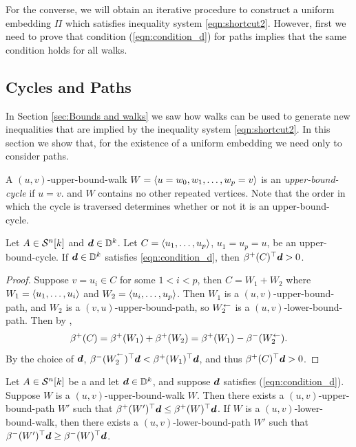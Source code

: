 \documentclass[runningheads]{llncs}
\begin{document}
For the converse, we will obtain an iterative procedure to construct a uniform embedding $\Pi$ which satisfies inequality system \cref{eqn:shortcut2}. However, first we need to prove that condition (\ref{eqn:condition_d}) for paths implies that the same condition holds for all walks. 

\subsection{Cycles and Paths}\label{sec:partial order}



In Section \ref{sec:Bounds and walks} we saw how walks can be used to generate new inequalities that are implied by the inequality system \ref{eqn:shortcut2}. 
In this section we show that, for the existence of a uniform embedding we need only to consider paths.

A $(u,v)$-upper-bound-walk $W=\langle u=w_0,w_1,\dots ,w_p=v\rangle$ is an {\em upper-bound-cycle} if $u=v$. and $W$ contains no other repeated vertices. Note that the order in which the cycle is traversed determines whether or not it is an upper-bound-cycle.


\begin{lemma}\label{lemma:ub cycle geq 0}
Let $A\in\mathcal S^n[k]$  and $\boldsymbol d\in\mathbb D^k$.
Let $C=\langle u_1,\dots, u_p\rangle$, $u_1=u_p=u$, be an upper-bound-cycle.
If $\boldsymbol d\in\mathbb D^k$ satisfies \cref{eqn:condition_d}, then $\beta^+(C)^\top\boldsymbol d > 0$.
\end{lemma}
\begin{proof}
Suppose $v=u_i\in C$ for some $1<i<p$, then $C=W_1 + W_2$ where 
$W_1=\langle u_1,\dots, u_i\rangle$  and 
$W_2 = \langle u_i,\dots, u_p\rangle$. Then $W_1$ is a $(u,v)$-upper-bound-path, and $W_2$ is a $(v,u)$-upper-bound-path, so $W_2^{\leftarrow}$ is a $(u,v)$-lower-bound-path.
Then by ,
$$
\beta^+(C) = \beta^+(W_1)+\beta^+(W_2)=\beta^+(W_1)-\beta^-(W_2^{\leftarrow}).
$$
By the choice of $\boldsymbol d$, 
$\beta^-(W_2^{^{\leftarrow}} )^\top \boldsymbol d < \beta^+(W_1 )^\top \boldsymbol d$, and thus $\beta^+(C)^\top\boldsymbol d > 0$. 


\end{proof}



\begin{lemma}\label{lemma:loopless}
Let $A\in\mathcal S^n[k]$  be a \diagincmat{} and let $\boldsymbol d\in\mathbb D^k$, and suppose $\boldsymbol d$ satisfies (\ref{eqn:condition_d}). 
Suppose $W$ is a $(u,v)$-upper-bound-walk $W$. Then there exists a $(u,v)$-upper-bound-path $W'$ such that $\beta^+(W')^\top\boldsymbol d
\leq \beta^+(W)^\top \boldsymbol d$. If $W$ is a $(u,v)$-lower-bound-walk, then there exists a $(u,v)$-lower-bound-path $W'$ such that $\beta^-(W')^\top\boldsymbol d
\geq \beta^-(W)^\top \boldsymbol d$.
\end{lemma}
\end{document}
